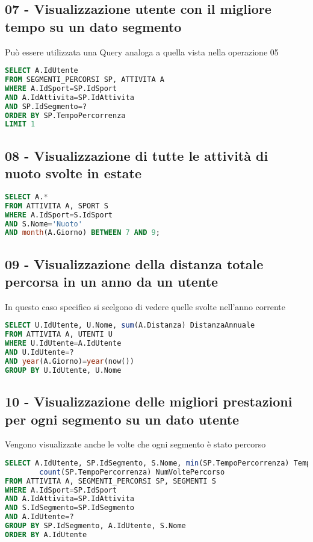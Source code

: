 \documentclass[12pt]{report}
\begin{document}
\subsection*{07 - Visualizzazione utente con il migliore tempo su un dato segmento}
Può essere utilizzata una Query analoga a quella vista nella operazione 05
\begin{lstlisting}[style=sql, language=SQL, label=lst:sql-query]
SELECT A.IdUtente
FROM SEGMENTI_PERCORSI SP, ATTIVITA A
WHERE A.IdSport=SP.IdSport
AND A.IdAttivita=SP.IdAttivita
AND SP.IdSegmento=?
ORDER BY SP.TempoPercorrenza
LIMIT 1
\end{lstlisting}


\subsection*{08 - Visualizzazione di tutte le attività di nuoto svolte in estate}
\begin{lstlisting}[style=sql, language=SQL, label=lst:sql-query]
SELECT A.*
FROM ATTIVITA A, SPORT S
WHERE A.IdSport=S.IdSport
AND S.Nome='Nuoto'
AND month(A.Giorno) BETWEEN 7 AND 9;
\end{lstlisting}


\subsection*{09 - Visualizzazione della distanza totale percorsa in un anno da un utente}
In questo caso specifico si scelgono di vedere quelle svolte nell'anno corrente
\begin{lstlisting}[style=sql, language=SQL, label=lst:sql-query]
SELECT U.IdUtente, U.Nome, sum(A.Distanza) DistanzaAnnuale
FROM ATTIVITA A, UTENTI U
WHERE U.IdUtente=A.IdUtente
AND U.IdUtente=?
AND year(A.Giorno)=year(now())
GROUP BY U.IdUtente, U.Nome
\end{lstlisting}


\subsection*{10 - Visualizzazione delle migliori prestazioni per ogni segmento su un dato utente}
Vengono visualizzate anche le volte che ogni segmento è stato percorso
\begin{lstlisting}[style=sql, language=SQL, label=lst:sql-query]
SELECT A.IdUtente, SP.IdSegmento, S.Nome, min(SP.TempoPercorrenza) TempoMinimo, 
        count(SP.TempoPercorrenza) NumVoltePercorso
FROM ATTIVITA A, SEGMENTI_PERCORSI SP, SEGMENTI S
WHERE A.IdSport=SP.IdSport
AND A.IdAttivita=SP.IdAttivita
AND S.IdSegmento=SP.IdSegmento
AND A.IdUtente=?
GROUP BY SP.IdSegmento, A.IdUtente, S.Nome
ORDER BY A.IdUtente
\end{lstlisting}
\end{document}
